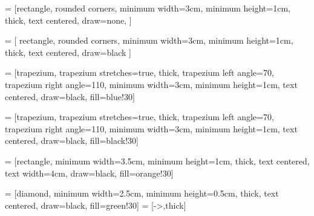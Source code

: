 \usetikzlibrary{automata, positioning, arrows}

\newcommand{\nobarfrac}{\genfrac{}{}{0pt}{}}
\loctimings
{}\unloctimings
{}\naturalerrors
{}\syntheticerrors

\usepackage[all,pdf]{xy}

\newcommand{\bs}{\blacksquare}
\newcommand{\ws}{\square}

\usepackage{multicol}
\usetikzlibrary{shapes.geometric, arrows}

 = [rectangle, rounded corners,
minimum width=3cm,
minimum height=1cm,
thick,
text centered,
draw=none,
]

 = [
rectangle,
rounded corners,
minimum width=3cm,
minimum height=1cm,
thick,
text centered,
draw=black
]

 = [trapezium,
trapezium stretches=true, %
thick,
trapezium left angle=70,
trapezium right angle=110,
minimum width=3cm,
minimum height=1cm, text centered,
draw=black, fill=blue!30]

 = [trapezium,
trapezium stretches=true, %
thick,
trapezium left angle=70,
trapezium right angle=110,
minimum width=3cm,
minimum height=1cm, text centered,
draw=black, fill=black!30]

 = [rectangle,
minimum width=3.5cm,
minimum height=1cm,
thick,
text centered,
text width=4cm,
draw=black,
fill=orange!30]

 = [diamond,
minimum width=2.5cm,
minimum height=0.5cm,
thick,
text centered,
draw=black,
fill=green!30]
 = [->,thick]

